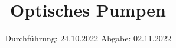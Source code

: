 
\usepackage{nicefrac}
\subject{V 21}
\title{Optisches Pumpen}
\date{%
  Durchführung: 24.10.2022
  \hspace{3em}
  Abgabe: 02.11.2022
}



\maketitle
\thispagestyle{empty}
\tableofcontents
\newpage







\printbibliography{}



